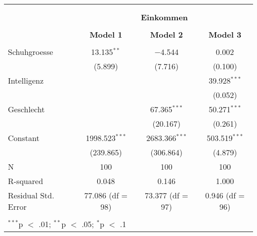 
\begin{tabular}{@{\extracolsep{5pt}}lccc} 
\\[-1.8ex]\hline \\[-1.8ex] 
\\[-1.8ex] & \multicolumn{3}{c}{\textbf{Einkommen}} \\ 
\\[-1.8ex] & \textbf{Model 1} & \textbf{Model 2} & \textbf{Model 3}\\ 
\hline \\[-1.8ex] 
 Schuhgroesse & 13.135$^{**}$ & $-$4.544 & 0.002 \\ 
  & (5.899) & (7.716) & (0.100) \\ 
  Intelligenz &  &  & 39.928$^{***}$ \\ 
  &  &  & (0.052) \\ 
  Geschlecht &  & 67.365$^{***}$ & 50.271$^{***}$ \\ 
  &  & (20.167) & (0.261) \\ 
  Constant & 1998.523$^{***}$ & 2683.366$^{***}$ & 503.519$^{***}$ \\ 
  & (239.865) & (306.864) & (4.879) \\ 
 N & 100 & 100 & 100 \\ 
R-squared & 0.048 & 0.146 & 1.000 \\ 
Residual Std. Error & 77.086 (df = 98) & 73.377 (df = 97) & 0.946 (df = 96) \\ 
\hline \\[-1.8ex] 
\multicolumn{4}{l}{$^{***}$p $<$ .01; $^{**}$p $<$ .05; $^{*}$p $<$ .1} \\ 
\end{tabular} 
